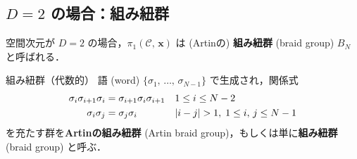 \documentclass[TQFT_main]{subfiles}
\begin{document}
\subsection{$D = 2$ の場合：組み紐群}

空間次元が $D = 2$ の場合，$\pi_1 (\mathcal{C},\, \bm{x})$ は (Artinの) \textbf{組み紐群} (braid group) $B_N$ と呼ばれる．

\begin{mydef}[label=def:braidg]{組み紐群（代数的）}
    語 (word) $\{\sigma_1,\, \dots,\, \sigma_{N-1}\}$ で生成され，関係式
    \begin{align}
        \sigma_i \sigma_{i+1} \sigma_i &= \sigma_{i+1} \sigma_i \sigma_{i+1}& &1 \le i \le N - 2 \\ 
        \sigma_i \sigma_j &= \sigma_{j} \sigma_i  & &\abs{i-j} > 1,\; 1 \le i,\, j \le N - 1 \\ 
    \end{align}
    を充たす群を\textbf{Artinの組み紐群} (Artin braid group)，もしくは単に\textbf{組み紐群} (braid group) と呼ぶ．
\end{mydef}
\end{document}
